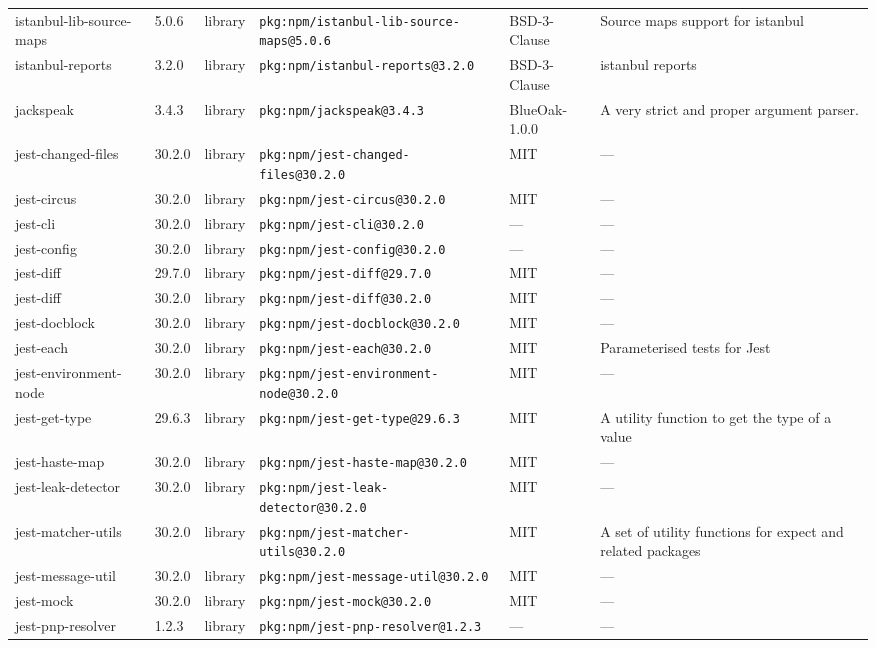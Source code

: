 \documentclass[11pt]{article}
\begin{document}
\begin{longtable}{|l|l|l|p{2.2cm}|l|p{4cm}|}
istanbul-lib-source-maps & 5.0.6 & library & \texttt{pkg:npm/istanbul-lib-source-maps@5.0.6} & BSD-3-Clause & Source maps support for istanbul \\
istanbul-reports & 3.2.0 & library & \texttt{pkg:npm/istanbul-reports@3.2.0} & BSD-3-Clause & istanbul reports \\
jackspeak & 3.4.3 & library & \texttt{pkg:npm/jackspeak@3.4.3} & BlueOak-1.0.0 & A very strict and proper argument parser. \\
jest-changed-files & 30.2.0 & library & \texttt{pkg:npm/jest-changed-files@30.2.0} & MIT & — \\
jest-circus & 30.2.0 & library & \texttt{pkg:npm/jest-circus@30.2.0} & MIT & — \\
jest-cli & 30.2.0 & library & \texttt{pkg:npm/jest-cli@30.2.0} & — & — \\
jest-config & 30.2.0 & library & \texttt{pkg:npm/jest-config@30.2.0} & — & — \\
jest-diff & 29.7.0 & library & \texttt{pkg:npm/jest-diff@29.7.0} & MIT & — \\
jest-diff & 30.2.0 & library & \texttt{pkg:npm/jest-diff@30.2.0} & MIT & — \\
jest-docblock & 30.2.0 & library & \texttt{pkg:npm/jest-docblock@30.2.0} & MIT & — \\
jest-each & 30.2.0 & library & \texttt{pkg:npm/jest-each@30.2.0} & MIT & Parameterised tests for Jest \\
jest-environment-node & 30.2.0 & library & \texttt{pkg:npm/jest-environment-node@30.2.0} & MIT & — \\
jest-get-type & 29.6.3 & library & \texttt{pkg:npm/jest-get-type@29.6.3} & MIT & A utility function to get the type of a value \\
jest-haste-map & 30.2.0 & library & \texttt{pkg:npm/jest-haste-map@30.2.0} & MIT & — \\
jest-leak-detector & 30.2.0 & library & \texttt{pkg:npm/jest-leak-detector@30.2.0} & MIT & — \\
jest-matcher-utils & 30.2.0 & library & \texttt{pkg:npm/jest-matcher-utils@30.2.0} & MIT & A set of utility functions for expect and related packages \\
jest-message-util & 30.2.0 & library & \texttt{pkg:npm/jest-message-util@30.2.0} & MIT & — \\
jest-mock & 30.2.0 & library & \texttt{pkg:npm/jest-mock@30.2.0} & MIT & — \\
jest-pnp-resolver & 1.2.3 & library & \texttt{pkg:npm/jest-pnp-resolver@1.2.3} & — & — \\

\end{longtable}
\end{document}
